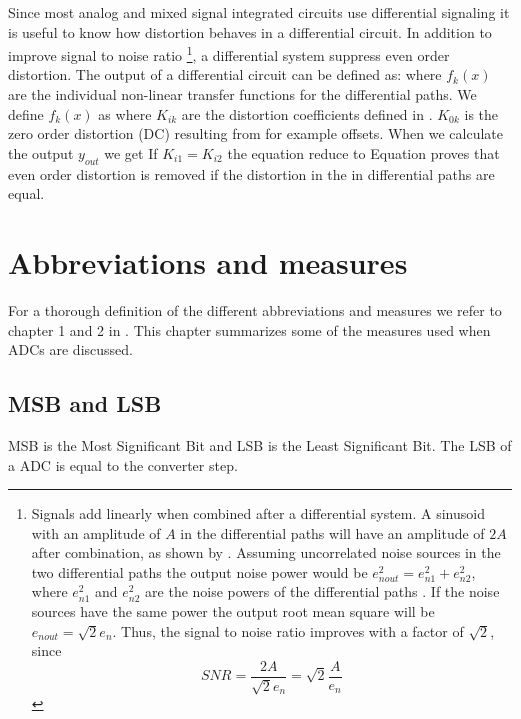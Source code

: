 Since most analog and mixed signal integrated circuits use differential
signaling it is useful to know how distortion behaves in a
differential circuit. In addition to improve signal to noise ratio
\footnote{Signals add linearly when combined after a differential
  system. A sinusoid with an amplitude of $A$ in the differential
  paths will have an amplitude of $2A$ after combination, as shown by . Assuming uncorrelated noise sources in the two
  differential paths the output noise power would be $e_{nout}^2 = e_{n1}^2 +
  e_{n2}^2$, where  $e_{n1}^2$ and
  $e_{n2}^2$ are the noise powers of the differential paths . If the noise sources have the same power the output root mean
  square will be $e_{nout} = \sqrt{2}e_n$. Thus, the signal to
  noise ratio improves with a factor of $\sqrt{2}$, since \[ SNR = \frac{2A}{\sqrt{2}e_n}
  = \sqrt{2}\frac{A}{e_n}\]}, a
differential system suppress even order distortion. The output of a
differential circuit can be defined as:
where $f_k(x)$ are the individual non-linear transfer functions for the
  differential paths. We define $f_k(x)$ as
where $K_{ik}$ are the distortion coefficients defined in
  . $K_{0k}$ is the zero order distortion (DC) resulting
  from for example offsets. When we calculate the output $y_{out}$ we
  get
If $K_{i1} = K_{i2}$ the equation reduce to 
Equation  proves that even order distortion is removed if the distortion in the
  in differential paths are equal. 



\section{Abbreviations and  measures} \label{sc:adc_measures}
For a thorough definition of the different abbreviations and  measures we refer to chapter
1 and 2 in \cite{plassche}. This chapter summarizes some of the
measures used when ADCs are discussed.

\subsection{MSB and LSB}
MSB is the Most Significant Bit and LSB is the Least Significant
Bit. The LSB of a ADC is equal to the converter step.


